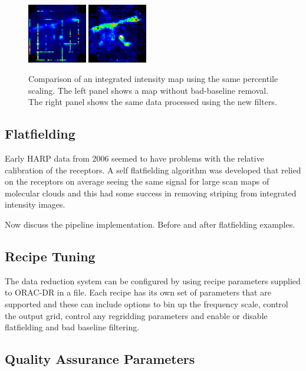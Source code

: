 \documentclass[final,authoryear,5p,times,twocolumn]{elsarticle}
\begin{document}
\begin{figure}
\includegraphics[width=0.23\textwidth]{P61_f3a}
\includegraphics[width=0.23\textwidth]{P61_f3b}
\caption{Comparison of an integrated intensity map using the same
  percentile scaling.  The left panel shows a map without bad-baseline
  removal.  The right panel shows the same data processed using the
  new filters.}
\label{fig:badbase:results}
\end{figure}

\subsection{Flatfielding}

Early HARP data from 2006 seemed to have problems with the relative
calibration of the receptors. A self flatfielding algorithm was
developed that relied on the receptors on average seeing the same
signal for large scan maps of molecular clouds
\citep{2010MNRAS.401..455C} and this had some success in removing
striping from integrated intensity images.

Now discuss the pipeline implementation. Before and after flatfielding examples.

\subsection{Recipe Tuning}

The data reduction system can be configured by using recipe parameters
supplied to ORAC-DR in a file. Each recipe has its own set of
parameters that are supported and these can include options to bin up
the frequency scale, control the output grid, control any regridding
parameters and enable or disable flatfielding and bad baseline filtering.

\subsection{Quality Assurance Parameters \label{sec:qa}}
\end{document}
